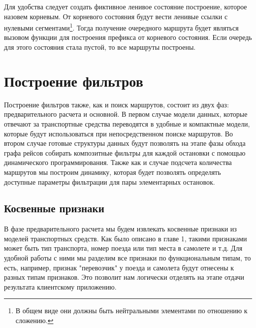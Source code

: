 Для удобства следует создать фиктивное ленивое состояние построение, которое назовем корневым. От корневого состояния будут вести ленивые ссылки с нулевыми сегментами\footnote{В общем виде они должны быть нейтральными элементами по отношению к сложению.}. Тогда получение очередного маршрута будет являться вызовом функции для построения префикса от корневого состояния. Если очередь для этого состояния стала пустой, то все маршруты построены.

\section{Построение фильтров}
Построение фильтров также, как и поиск маршрутов, состоит из двух фаз: предварительного расчета и основной. В первом случае модели данных, которые отвечают за транспортные средства переводятся в удобные и компактные модели, которые будут использоваться при непосредственном поиске маршрутов. Во втором случае готовые структуры данных будут позволять на этапе фазы обхода графа рейсов собирать композитные фильтры для каждой остановки с помощью динамического программирования. Также как и случае подсчета количества маршрутов мы построим динамику, которая будет позволять определять доступные параметры фильтрации для пары элементарных остановок.

\subsection{Косвенные признаки}
В фазе предварительного расчета мы будем извлекать косвенные признаки из моделей транспортных средств. Как было описано в главе 1, такими признаками может быть тип транспорта, номер поезда или тип места в самолете и т.д. Для удобной работы с ними мы разделим все признаки по функциональным типам, то есть, например, признак "перевозчик" у поезда и самолета будут отнесены к разных типам признаков. Это позволит нам логически отделять на этапе отдачи результата клиентскому приложению.

